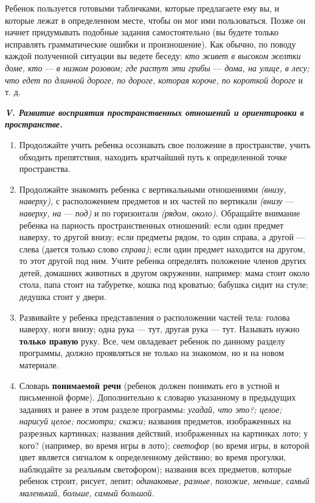 \documentclass[a5paper]{book}
\renewcommand{\emph}[1]{\textit{#1}}
\begin{document}
Ребенок пользуется готовыми табличками, которые предлагаете ему вы, и
которые лежат в определенном месте, чтобы он мог ими пользоваться. Позже
он начнет придумывать подобные задания самостоятельно (вы будете только
исправлять грамматические ошибки и произношение). Как обычно, по поводу
каждой полученной ситуации вы ведете беседу: \emph{кто живет в высоком
желтки доме, кто} --- \emph{в низком розовом; где растут эти грибы} ---
\emph{дома, на улице, в лесу; что едет по длинной дороге, по дороге,
которая короче, по короткой дороге} и т. д.

\emph{\textbf{V. Развитие восприятия пространственных отношений и
ориентировки в пространстве.}}


\begin{enumerate}
\def\labelenumi{\arabic{enumi}.}
\item
  
  Продолжайте учить ребенка осознавать свое положение в пространстве,
  учить обходить препятствия, находить кратчайший путь к определенной
  точке пространства.
  
\item
  
  Продолжайте знакомить ребенка с вертикальными отношениями
  \emph{(внизу, наверху),} с расположением предметов и их частей по
  вертикали \emph{(внизу} --- \emph{наверху, на} --- \emph{под)} и по
  горизонтали \emph{(рядом, около).} Обращайте внимание ребенка на
  парность пространственных отношений: если один предмет наверху, то
  другой внизу; если предметы рядом, то один справа, а другой --- слева
  (дается только слово \emph{справа)}; если один предмет находится на
  другом, то этот другой под ним. Учите ребенка определять положение
  членов других детей, домашних животных в другом окружении, например:
  мама стоит около стола, папа стоит на табуретке, кошка под кроватью;
  бабушка сидит на стуле; дедушка стоит у двери.
  
\item
  
  Развивайте у ребенка представления о расположении частей тела: голова
  наверху, ноги внизу; одна рука --- тут, другая рука --- тут. Называть
  нужно \textbf{только правую} руку. Все, чем овладевает ребенок по
  данному разделу программы, должно проявляться не только на знакомом,
  но и на новом материале.
  
\item
  
  Словарь \textbf{понимаемой речи} (ребенок должен понимать его в устной
  и письменной форме). Дополнительно к словарю указанному в предыдущих
  заданиях и ранее в этом разделе программы: \emph{угадай, что это?;
  целое; нарисуй целое; посмотри; скажи;} названия предметов,
  изображенных на разрезных картинках; названия действий, изображенных
  на картинках лото; у кого? (например, во время игры в лото);
  \emph{светофор} (во время игры, в которой цвет является сигналом к
  определенному действию; во время прогулки, наблюдайте за реальным
  светофором); названия всех предметов, которые ребенок строит, рисует,
  лепит; \emph{одинаковые, разные, похожие, меньше, самый маленький,
  больше, самый большой.}
  
\end{enumerate}
\end{document}

